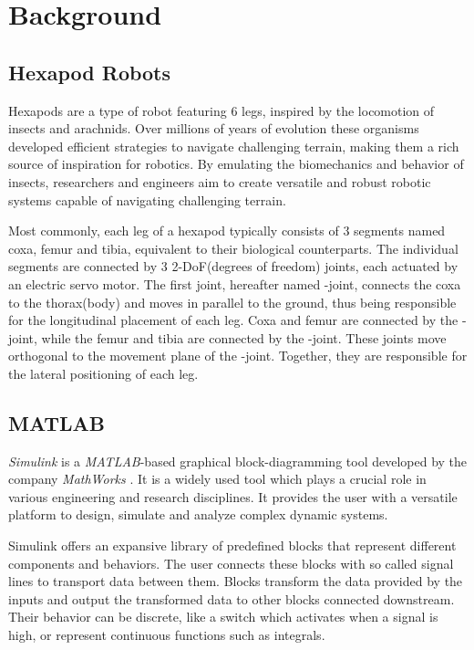 \chapter{Background}
\label{ch:background}


\section{Hexapod Robots}
Hexapods are a type of robot featuring 6 legs, inspired by the locomotion of insects and arachnids.
Over millions of years of evolution these organisms developed efficient strategies to navigate challenging terrain, making them a rich source of inspiration for robotics.
By emulating the biomechanics and behavior of insects, researchers and engineers aim to create versatile and robust robotic systems capable of navigating challenging terrain.

Most commonly, each leg of a hexapod typically consists of 3 segments named coxa, femur and tibia, equivalent to their biological counterparts.
The individual segments are connected by 3 2-DoF(degrees of freedom) joints, each actuated by an electric servo motor.
The first joint, hereafter named \textalpha-joint, connects the coxa to the thorax(body) and moves in parallel to the ground, thus being responsible for the longitudinal placement of each leg.
Coxa and femur are connected by the \textbeta-joint, while the femur and tibia are connected by the \textgamma-joint. 
These joints move orthogonal to the movement plane of the \textalpha-joint. Together, they are responsible for the lateral positioning of each leg.





\section{MATLAB}
\textit{Simulink\textsuperscript{\textregistered}} is a \textit{MATLAB\textsuperscript{\textregistered}}-based graphical block-diagramming tool developed by the company \textit{MathWorks\textsuperscript{\textregistered}} .
It is a widely used tool which plays a crucial role in various engineering and research disciplines.
It provides the user with a versatile platform to design, simulate and analyze complex dynamic systems.

Simulink offers an expansive library of predefined blocks that represent different components and behaviors.
The user connects these blocks with so called signal lines to transport data between them.
Blocks transform the data provided by the inputs and output the transformed data to other blocks connected downstream.
Their behavior can be discrete, like a switch which activates when a signal is high, or represent continuous functions such as integrals.

